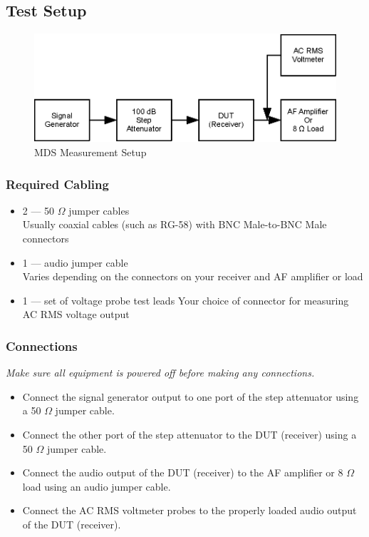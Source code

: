 \documentclass[10pt,letterpaper]{book}
\begin{document}
\subsection*{Test Setup}
\begin{figure}
\centering
\includegraphics[scale=1]{Illustrations/MDSSetup}
\caption{MDS Measurement Setup}
\end{figure}
\subsubsection*{Required Cabling}
\begin{itemize}
	\item 2 --- 50 $\Omega$ jumper cables \\
		Usually coaxial cables (such as RG-58) with BNC Male-to-BNC Male connectors
	\item 1 --- audio jumper cable \\
		Varies depending on the connectors on your receiver and AF amplifier or load
	\item 1 --- set of voltage probe test leads \vspace{30pt}
		Your choice of connector for measuring AC RMS voltage output
\end{itemize}
\subsubsection*{Connections}
\emph{Make sure all equipment is powered off before making any connections.}
\begin{itemize}
	\item Connect the signal generator output to one port of the step attenuator using a 50 $\Omega$ jumper cable.
	\item Connect the other port of the step attenuator to the DUT (receiver) using a 50 $\Omega$ jumper cable.
	\item Connect the audio output of the DUT (receiver) to the AF amplifier or 8 $\Omega$ load using an audio jumper cable.
	\item Connect the AC RMS voltmeter probes to the properly loaded audio output of the DUT (receiver).
\end{itemize}
\end{document}
